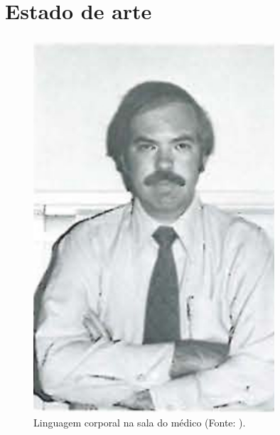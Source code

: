 \section{Estado de arte}


\begin{frame}
\frametitle{}
\begin{figure}[!ht]
    \centering
    \caption{Linguagem corporal na sala do médico (Fonte: \textcite{Allen1976BodyLI}).}
    \begin{minipage}[t]{0.24\textwidth}
      \centering
      \includegraphics[width=0.8\textwidth]{images/dentista1.jpg}
    \end{minipage}
    \hfill
    \begin{minipage}[t]{0.24\textwidth}
      \centering

\end{minipage}
\end{figure}
\end{frame}
